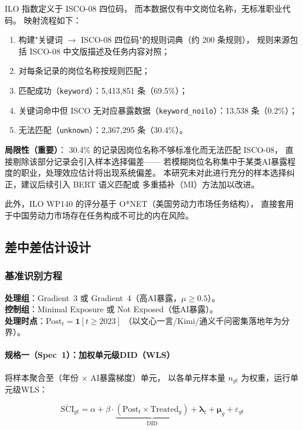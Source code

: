 \documentclass[12pt,a4paper]{ctexart}
\begin{document}
ILO 指数定义于 ISCO-08 四位码，
而本数据仅有中文岗位名称，无标准职业代码。
映射流程如下：
\begin{enumerate}[label=(\arabic*)]
    \item 构建"关键词 $\to$ ISCO-08 四位码"的规则词典（约 200 条规则），
    规则来源包括 ISCO-08 中文版描述及任务内容对照；
    \item 对每条记录的岗位名称按规则匹配；
    \item 匹配成功（\texttt{keyword}）：5,413,851 条（69.5\%）；
    \item 关键词命中但 ISCO 无对应暴露数据（\texttt{keyword\_noilo}）：13,538 条（0.2\%）；
    \item 无法匹配（\texttt{unknown}）：2,367,295 条（30.4\%）。
\end{enumerate}

\textbf{局限性（重要）}：
30.4\% 的记录因岗位名称不够标准化而无法匹配 ISCO-08，
直接剔除该部分记录会引入样本选择偏差——
若模糊岗位名称集中于某类AI暴露程度的职业，处理效应估计将出现系统偏差。
本研究未对此进行充分的样本选择纠正，建议后续引入 BERT 语义匹配或
多重插补（MI）方法加以改进。

此外，ILO WP140 的评分基于 O*NET（美国劳动力市场任务结构），
直接套用于中国劳动力市场存在任务构成不可比的内在风险。

\subsection{差中差估计设计}

\subsubsection{基准识别方程}

\textbf{处理组}：Gradient~3 或 Gradient~4（高AI暴露，$\mu \geq 0.5$）。\\
\textbf{控制组}：Minimal Exposure 或 Not Exposed（低AI暴露）。\\
\textbf{处理时点}：$\text{Post}_t = \mathbf{1}[t \geq 2023]$
（以文心一言/Kimi/通义千问密集落地年为分界）。

\paragraph{规格一（Spec~1）：加权单元级DID（WLS）}

将样本聚合至（年份 $\times$ AI暴露梯度）单元，
以各单元样本量 $n_{gt}$ 为权重，运行单元级WLS：

\begin{equation}
\label{eq:cell_did}
\overline{\text{SCI}}_{gt} = \alpha + \beta \cdot \underbrace{(\text{Post}_t \times \text{Treated}_g)}_{\text{DID}} + \boldsymbol{\lambda}_t + \boldsymbol{\mu}_g + \varepsilon_{gt}
\end{equation}
\end{document}
